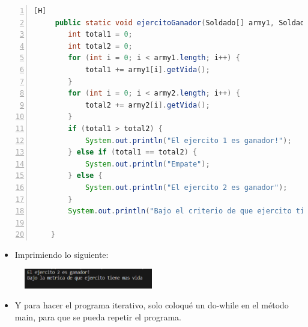 \documentclass{article}
\begin{document}
	\begin{lstlisting}[language=java,caption={Determinando el ganador}, numbers=left][H]
	 public static void ejercitoGanador(Soldado[] army1, Soldado[] army2) {
        int total1 = 0;
        int total2 = 0;
        for (int i = 0; i < army1.length; i++) {
            total1 += army1[i].getVida();
        }
        for (int i = 0; i < army2.length; i++) {
            total2 += army2[i].getVida();
        }
        if (total1 > total2) {
            System.out.println("El ejercito 1 es ganador!");
        } else if (total1 == total2) {
            System.out.println("Empate");
        } else {
            System.out.println("El ejercito 2 es ganador");
        }
        System.out.println("Bajo el criterio de que ejercito tiene mas vida total");

    }
	\end{lstlisting}
	\begin{itemize}	
		\item Imprimiendo lo siguiente: 
	\end{itemize}
	
	\begin{figure}[H]
		\centering
	\includegraphics[width=0.5\textwidth,keepaspectratio]{img/captura6.png}
	\end{figure}
	
	\begin{itemize}	
		\item Y para hacer el programa iterativo, solo coloqué un do-while en el método main, para que se pueda repetir el programa.
	\end{itemize}
	
\end{document}
